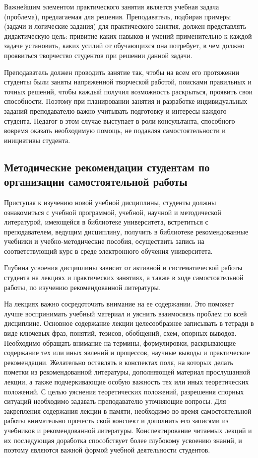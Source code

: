 \documentclass[a4paper, 12pt]{article}
\begin{document}
Важнейшим элементом практического занятия является учебная задача (проблема), предлагаемая для решения. Преподаватель, подбирая примеры (задачи и логические задания) для практического занятия, должен представлять дидактическую цель: привитие каких навыков и умений применительно к каждой задаче установить, каких усилий от обучающихся она потребует, в чем должно проявиться творчество студентов при решении данной задачи.

Преподаватель должен проводить занятие так, чтобы на всем его протяжении студенты были заняты напряженной творческой работой, поисками правильных и точных решений, чтобы каждый получил возможность раскрыться, проявить свои способности. Поэтому при планировании занятия и разработке индивидуальных заданий преподавателю важно учитывать подготовку и интересы каждого студента. Педагог в этом случае выступает в роли консультанта,  способного вовремя оказать необходимую помощь, не подавляя самостоятельности и инициативы студента.

\subsection{Методические рекомендации студентам по организации самостоятельной работы}

Приступая к изучению новой учебной дисциплины, студенты должны ознакомиться с учебной программой, учебной, научной и методической литературой, имеющейся в библиотеке университета, встретиться с преподавателем, ведущим дисциплину, получить в библиотеке рекомендованные учебники и учебно-методические пособия, осуществить запись на соответствующий курс в среде электронного обучения университета.

Глубина усвоения дисциплины зависит от активной и систематической работы студента на лекциях и практических занятиях, а также в ходе самостоятельной работы, по изучению рекомендованной литературы. 

На лекциях важно сосредоточить внимание на ее содержании. Это поможет лучше воспринимать учебный материал и уяснить взаимосвязь проблем по всей дисциплине. Основное содержание лекции целесообразнее записывать в тетради в виде ключевых фраз, понятий, тезисов, обобщений, схем, опорных выводов. Необходимо обращать внимание на термины, формулировки, раскрывающие содержание тех или иных явлений и процессов, научные выводы и практические рекомендации. Желательно оставлять в конспектах поля, на которых делать пометки из рекомендованной литературы, дополняющей материал прослушанной лекции, а также подчеркивающие особую важность тех или иных теоретических положений. С целью уяснения теоретических положений, разрешения спорных ситуаций необходимо задавать преподавателю уточняющие вопросы. Для закрепления содержания лекции в памяти, необходимо во время самостоятельной работы внимательно прочесть свой конспект и дополнить его записями из учебников и рекомендованной литературы. Конспектирование читаемых лекций и их последующая доработка способствует более глубокому усвоению знаний, и поэтому являются важной формой учебной деятельности студентов.
\end{document}
